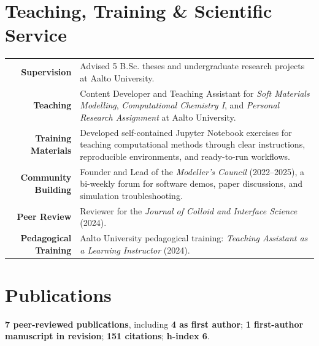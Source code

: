 \documentclass[a4paper,10pt]{article}
\begin{document}
\section{Teaching, Training \& Scientific Service}
\begin{tabularx}{\linewidth}{@{}R Y@{}}
\textbf{Supervision} & Advised 5 B.Sc. theses and undergraduate research projects at Aalto University. \\[2pt]
\textbf{Teaching} & Content Developer and Teaching Assistant for \textit{Soft Materials Modelling}, \textit{Computational Chemistry I}, and \textit{Personal Research Assignment} at Aalto University. \\[2pt]
\textbf{Training Materials} & Developed self-contained Jupyter Notebook exercises for teaching computational methods through clear instructions, reproducible environments, and ready-to-run workflows. \\[2pt]
\textbf{Community Building} & Founder and Lead of the \textit{Modeller's Council} (2022--2025), a bi-weekly forum for software demos, paper discussions, and simulation troubleshooting. \\[2pt]
\textbf{Peer Review} & Reviewer for the \textit{Journal of Colloid and Interface Science} (2024). \\[2pt]
\textbf{Pedagogical Training} & Aalto University pedagogical training: \textit{Teaching Assistant as a Learning Instructor} (2024). \\
\end{tabularx}

\section{Publications}
\textbf{7 peer-reviewed publications}, including \textbf{4 as first author}; \textbf{1 first-author manuscript in revision}; \textbf{151 citations}; \textbf{h-index 6}.
\vspace{0.3em}
\end{document}
